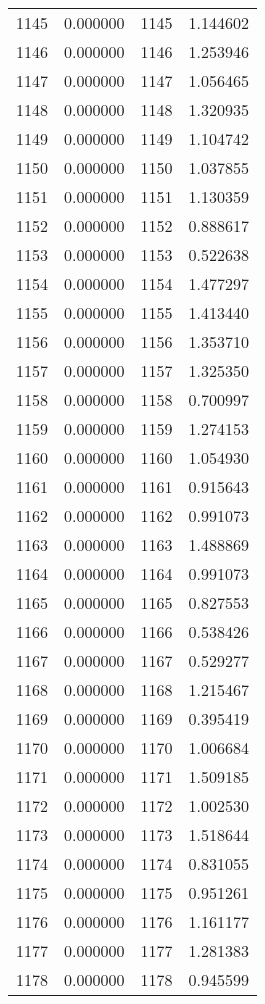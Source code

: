 \documentclass[12pt]{article}
\begin{document}
\begin{longtable}{@{}cccc@{}}
1145 & 0.000000 & 1145 & 1.144602 \\
1146 & 0.000000 & 1146 & 1.253946 \\
1147 & 0.000000 & 1147 & 1.056465 \\
1148 & 0.000000 & 1148 & 1.320935 \\
1149 & 0.000000 & 1149 & 1.104742 \\
1150 & 0.000000 & 1150 & 1.037855 \\
1151 & 0.000000 & 1151 & 1.130359 \\
1152 & 0.000000 & 1152 & 0.888617 \\
1153 & 0.000000 & 1153 & 0.522638 \\
1154 & 0.000000 & 1154 & 1.477297 \\
1155 & 0.000000 & 1155 & 1.413440 \\
1156 & 0.000000 & 1156 & 1.353710 \\
1157 & 0.000000 & 1157 & 1.325350 \\
1158 & 0.000000 & 1158 & 0.700997 \\
1159 & 0.000000 & 1159 & 1.274153 \\
1160 & 0.000000 & 1160 & 1.054930 \\
1161 & 0.000000 & 1161 & 0.915643 \\
1162 & 0.000000 & 1162 & 0.991073 \\
1163 & 0.000000 & 1163 & 1.488869 \\
1164 & 0.000000 & 1164 & 0.991073 \\
1165 & 0.000000 & 1165 & 0.827553 \\
1166 & 0.000000 & 1166 & 0.538426 \\
1167 & 0.000000 & 1167 & 0.529277 \\
1168 & 0.000000 & 1168 & 1.215467 \\
1169 & 0.000000 & 1169 & 0.395419 \\
1170 & 0.000000 & 1170 & 1.006684 \\
1171 & 0.000000 & 1171 & 1.509185 \\
1172 & 0.000000 & 1172 & 1.002530 \\
1173 & 0.000000 & 1173 & 1.518644 \\
1174 & 0.000000 & 1174 & 0.831055 \\
1175 & 0.000000 & 1175 & 0.951261 \\
1176 & 0.000000 & 1176 & 1.161177 \\
1177 & 0.000000 & 1177 & 1.281383 \\
1178 & 0.000000 & 1178 & 0.945599 \\

\end{longtable}
\end{document}
